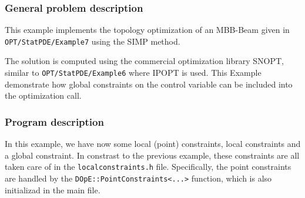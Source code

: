 \subsubsection{General problem description}
This example implements the topology optimization of an MBB-Beam given in \\
{\tt OPT/StatPDE/Example7} using the SIMP method.

The solution is computed using the commercial optimization library SNOPT, similar 
to {\tt OPT/StatPDE/Example6} where IPOPT is used. 
This Example demonstrate how global constraints on
the control variable can be included into the optimization call.

\subsubsection{Program description}
In this example, we have now some local (point) constraints, local constraints and a global
constraint. In constrast to the previous example, these 
constraints are all taken care of in the 
\texttt{localconstraints.h} file. 
Specifically, the point constraints are handled by the 
\texttt{DOpE::PointConstraints<...>} function, which is also initializad 
in the main file. 


